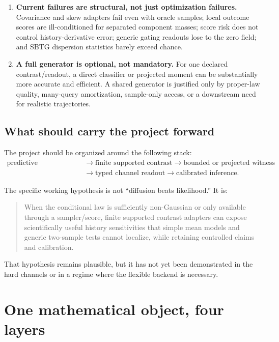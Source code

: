 \documentclass[10pt]{article}
\begin{document}
\begin{enumerate}
  \item \textbf{Current failures are structural, not just optimization failures.} Covariance and skew adapters fail even with oracle samples; local outcome scores are ill-conditioned for separated component masses; score risk does not control history-derivative error; generic gating readouts lose to the zero field; and SBTG dispersion statistics barely exceed chance.
  \item \textbf{A full generator is optional, not mandatory.} For one declared contrast/readout, a direct classifier or projected moment can be substantially more accurate and efficient. A shared generator is justified only by proper-law quality, many-query amortization, sample-only access, or a downstream need for realistic trajectories.
\end{enumerate}

\subsection{What should carry the project forward}

The project should be organized around the following stack:
\[
\begin{aligned}
\text{predictive law/generator}
&\longrightarrow \text{finite supported contrast}
\longrightarrow \text{bounded or projected witness}\\
&\longrightarrow \text{typed channel readout}
\longrightarrow \text{calibrated inference}.
\end{aligned}
\]

The specific working hypothesis is not ``diffusion beats likelihood.'' It is:

\begin{quote}
When the conditional law is sufficiently non-Gaussian or only available through a sampler/score, finite supported contrast adapters can expose scientifically useful history sensitivities that simple mean models and generic two-sample tests cannot localize, while retaining controlled claims and calibration.
\end{quote}

That hypothesis remains plausible, but it has not yet been demonstrated in the hard channels or in a regime where the flexible backend is necessary.

\section{One mathematical object, four layers}
\end{document}
